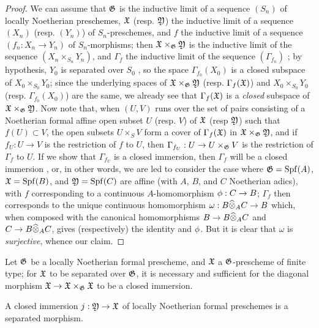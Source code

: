 \begin{proof}
\label{proof-1.10.15.4}
We can assume that $\mathfrak{G}$ is the inductive limit of a sequence $(S_n)$ of locally Noetherian preschemes, $\mathfrak{X}$ (resp. $\mathfrak{Y}$) the inductive limit of a sequence $(X_n)$ (resp. $(Y_n)$) of $S_n$-preschemes, and $f$ the inductive limit of a sequence $(f_n:X_n\to Y_n)$ of $S_n$-morphisms;
then $\mathfrak{X}\times_\mathfrak{G}\mathfrak{Y}$ is the inductive limit of the sequence $(X_n\times_{S_n}Y_n)$, and $\Gamma_f$ the inductive limit of the sequence $(\Gamma_{f_n})$ ;
by hypothesis, $Y_0$ is separated over $S_0$ , so the space $\Gamma_{f_0}(X_0)$ is a closed subspace of $X_0\times_{S_0}Y_0$;
since the underlying spaces of $\mathfrak{X}\times_\mathfrak{G}\mathfrak{Y}$ (resp. $\Gamma_f(\mathfrak{X})$) and $X_0\times_{S_0}Y_0$ (resp. $\Gamma_{f_0}(X_0)$) are the same, we already see that $\Gamma_f(\mathfrak{X})$ is a \emph{closed} subspace of $\mathfrak{X}\times_\mathfrak{G}\mathfrak{Y}$.
Now note that, when $(U,V)$ runs over the set of pairs consisting of a Noetherian formal affine open subset $U$ (resp. $V$) of $\mathfrak{X}$ (resp $\mathfrak{Y}$) such that $f(U)\subset V$, the open subsets $U\times_S V$ form a cover of $\Gamma_f(\mathfrak{X})$ in $\mathfrak{X}\times_\mathfrak{G}\mathfrak{Y}$, and if $f_U:U\to V$ is the restriction of $f$ to $U$, then $\Gamma_{f_U}:U\to U\times_\fk{G}V$ is the restriction of $\Gamma_f$ to $U$.
If we show that $\Gamma_{f_U}$ is a closed immersion, then $\Gamma_f$ will be a closed immersion , or, in other words, we are led to consider the case where $\mathfrak{G}={\mathop{\mathrm{Spf}}\nolimits}(A)$, $\mathfrak{X}={\mathop{\mathrm{Spf}}\nolimits}(B)$, and $\mathfrak{Y}={\mathop{\mathrm{Spf}}\nolimits}(C)$ are affine (with $A$, $B$, and $C$ Noetherian adics), with $f$ corresponding to a continuous $A$-homomorphism $\vphi:C\to B$;
$\Gamma_f$ then corresponds to the unique continuous homomorphism $\omega: B\wh{\otimes}_A C\to B$ which, when composed with the canonical homomorphisms $B\to B\wh{\otimes}_A C$ and $C\to B\wh{\otimes}_A C$, gives (respectively) the identity and $\phi$.
But it is clear that $\omega$ is \emph{surjective}, whence our claim.
\end{proof}

\begin{cor}[10.15.5]
\label{1.10.15.5}
Let $\mathfrak{G}$ be a locally Noetherian formal prescheme, and $\mathfrak{X}$ a $\mathfrak{G}$-prescheme of finite type;
for $\mathfrak{X}$ to be separated over $\mathfrak{G}$, it is necessary and sufficient for the diagonal morphism $\fk{X}\to\fk{X}\times_\fk{G}\fk{X}$ to be a closed immersion.
\end{cor}

\begin{prop}[10.15.6]
\label{1.10.15.6}
A closed immersion $j:\fk{Y}\to\fk{X}$ of locally Noetherian formal preschemes is a separated morphism.
\end{prop}

